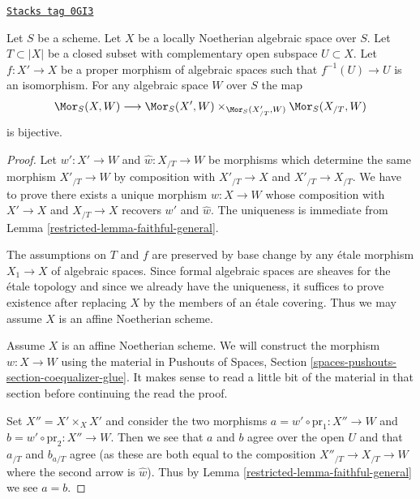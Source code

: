 \begin{proposition}
\label{restricted-proposition-glue-modification}
\href{https://stacks.math.columbia.edu/tag/0GI3}{\texttt{Stacks tag 0GI3}}

Let $S$ be a scheme. Let $X$ be a locally Noetherian algebraic space over $S$.
Let $T \subset |X|$ be a closed subset with complementary open subspace
$U \subset X$. Let $f : X' \to X$ be a proper morphism
of algebraic spaces such that $f^{-1}(U) \to U$ is an isomorphism.
For any algebraic space $W$ over $S$ the map
$$
\Mor_S(X, W) \longrightarrow
\Mor_S(X', W) \times_{\Mor_S(X'_{/T}, W)} \Mor_S(X_{/T}, W)
$$
is bijective.
\end{proposition}

\begin{proof}

Let $w' : X' \to W$ and $\hat w : X_{/T} \to W$ be morphisms
which determine the same morphism $X'_{/T} \to W$ by composition
with $X'_{/T} \to X$ and $X'_{/T} \to X_{/T}$. We have to prove
there exists a unique morphism $w : X \to W$ whose composition
with $X' \to X$ and $X_{/T} \to X$ recovers $w'$ and $\hat w$.
The uniqueness is immediate from Lemma \ref{restricted-lemma-faithful-general}.

\medskip\noindent
The assumptions on $T$ and $f$ are preserved by base change
by any \'etale morphism $X_1 \to X$ of algebraic spaces.
Since formal algebraic spaces are sheaves for the
\'etale topology and since we already have the uniqueness,
it suffices to prove existence after replacing $X$ by
the members of an \'etale covering. Thus we may assume $X$ is
an affine Noetherian scheme.

\medskip\noindent
Assume $X$ is an affine Noetherian scheme. We will construct
the morphism $w : X \to W$ using the material in
Pushouts of Spaces, Section \ref{spaces-pushouts-section-coequalizer-glue}.
It makes sense to read a little bit of the material
in that section before continuing the read the proof.

\medskip\noindent
Set $X'' = X' \times_X X'$ and consider the two morphisms
$a = w' \circ \text{pr}_1 : X'' \to W$ and
$b = w' \circ \text{pr}_2 : X'' \to W$.
Then we see that $a$ and $b$ agree over the open $U$
and that $a_{/T}$ and $b_{a/T}$ agree (as these are
both equal to the composition $X''_{/T} \to X_{/T} \to W$
where the second arrow is $\hat w$).
Thus by Lemma \ref{restricted-lemma-faithful-general}
we see $a = b$.


\end{proof}
